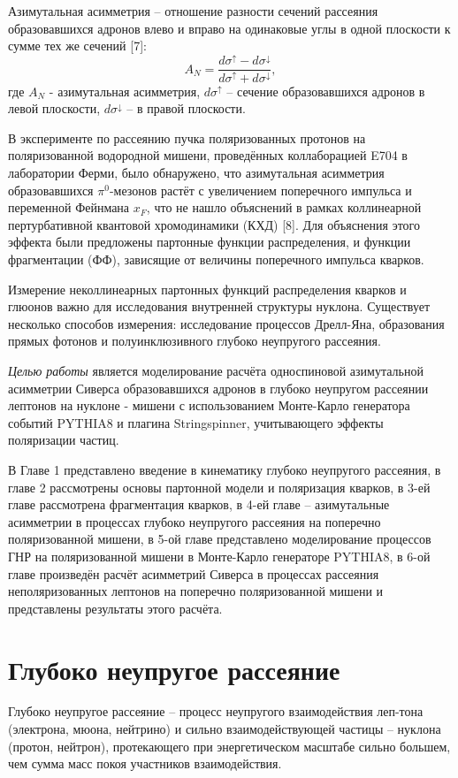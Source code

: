 \documentclass{extarticle}
\begin{document}
Азимутальная асимметрия – отношение разности сечений рассеяния образовавшихся адронов влево и вправо на одинаковые углы в одной плоскости к сумме тех же сечений [7]:
\begin{equation}
    A_N =\frac{d\sigma^\uparrow -d\sigma^\downarrow }{d\sigma^\uparrow +d\sigma^\downarrow },
\end{equation} 
где $A_N$ - азимутальная асимметрия, $d\sigma^\uparrow$  – сечение образовавшихся адронов в левой плоскости, $d\sigma^\downarrow$  – в правой плоскости.


 В эксперименте по рассеянию пучка поляризованных протонов на поляризованной водородной мишени, проведённых коллаборацией E704 в лаборатории Ферми, было обнаружено, что азимутальная асимметрия образовавшихся $\pi^0$-мезонов растёт с увеличением поперечного импульса и переменной Фейнмана $x_F$, что не нашло объяснений в рамках коллинеарной пертурбативной квантовой хромодинамики (КХД) [8]. Для объяснения этого эффекта были предложены партонные функции распределения, и функции фрагментации (ФФ), зависящие от величины поперечного импульса кварков.

 
 Измерение неколлинеарных партонных функций распределения кварков и глюонов важно для исследования внутренней структуры нуклона. Существует несколько способов измерения: исследование процессов Дрелл-Яна, образования прямых фотонов и полуинклюзивного глубоко неупругого рассеяния. 

\textit{Целью работы} является моделирование расчёта односпиновой азимутальной асимметрии Сиверса образовавшихся адронов в глубоко неупругом рассеянии лептонов на нуклоне - мишени с использованием Монте-Карло генератора событий PYTHIA8 и плагина Stringspinner, учитывающего эффекты поляризации частиц. 

В Главе 1 представлено введение в кинематику глубоко неупругого рассеяния, в главе 2 рассмотрены основы партонной модели и поляризация кварков, в 3-ей главе рассмотрена фрагментация кварков,  в 4-ей главе -- азимутальные асимметрии в процессах глубоко неупругого рассеяния на поперечно поляризованной мишени, в 5-ой главе представлено моделирование процессов ГНР на поляризованной мишени в Монте-Карло генераторе PYTHIA8, в 6-ой главе произведён расчёт асимметрий Сиверса в процессах рассеяния неполяризованных лептонов на поперечно поляризованной мишени и представлены результаты этого расчёта.

\newpage
\section{Глубоко неупругое рассеяние}
Глубоко неупругое рассеяние – процесс неупругого взаимодействия леп-тона (электрона, мюона, нейтрино) и сильно взаимодействующей частицы – нуклона (протон, нейтрон), протекающего при энергетическом масштабе сильно большем, чем сумма масс покоя участников взаимодействия.
\end{document}
